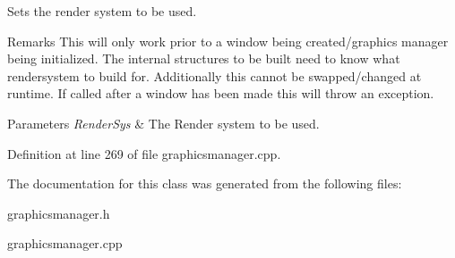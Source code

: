 Sets the render system to be used. 

\begin{DoxyRemark}{Remarks}
This will only work prior to a window being created/graphics manager being initialized. The internal structures to be built need to know what rendersystem to build for. Additionally this cannot be swapped/changed at runtime. If called after a window has been made this will throw an exception. 
\end{DoxyRemark}

\begin{DoxyParams}{Parameters}
{\em RenderSys} & The Render system to be used. \\
\hline
\end{DoxyParams}


Definition at line 269 of file graphicsmanager.cpp.



The documentation for this class was generated from the following files:\begin{DoxyCompactItemize}
\item 
graphicsmanager.h\item 
graphicsmanager.cpp\end{DoxyCompactItemize}
